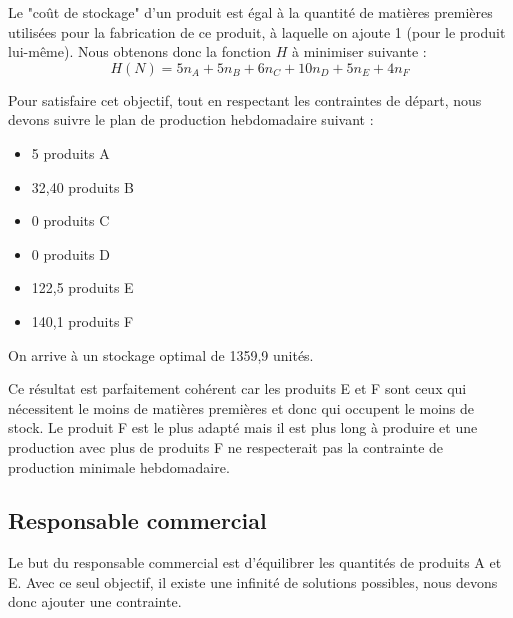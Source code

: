 \documentclass[a4paper,10pt]{article}
\begin{document}

Le "coût de stockage" d'un produit est égal à la quantité de matières premières utilisées pour la fabrication de ce produit, à laquelle on ajoute 1 (pour le produit lui-même). Nous obtenons donc la fonction $H$ à minimiser suivante :
$$ H(N)=  5n_A + 5n_B + 6n_C +10n_D + 5n_E + 4n_F $$

Pour satisfaire cet objectif, tout en respectant les contraintes de départ, nous devons suivre le plan de production hebdomadaire suivant :\newline
\begin{itemize}
\item[\textbullet] 5 produits A
\item[\textbullet] 32,40 produits B
\item[\textbullet] 0 produits C
\item[\textbullet] 0 produits D
\item[\textbullet] 122,5 produits E
\item[\textbullet] 140,1 produits F\newline
\end{itemize}

On arrive à un stockage optimal de 1359,9 unités.

Ce résultat est parfaitement cohérent car les produits E et F sont ceux qui nécessitent le moins de matières premières et donc qui occupent le moins de stock. Le produit F est le plus adapté mais il est plus long à produire et une production avec plus de produits F ne respecterait pas la contrainte de production minimale hebdomadaire.


\subsection{Responsable commercial}

Le but du responsable commercial est d'équilibrer les quantités de produits A et E. Avec ce seul objectif, il existe une infinité de solutions possibles, nous devons donc ajouter une contrainte.
\end{document}
